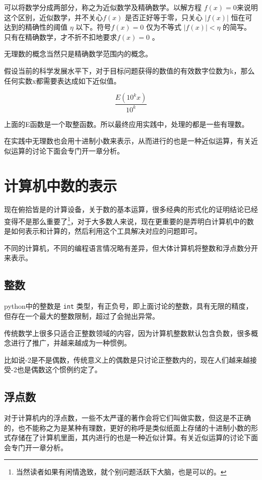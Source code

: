 \documentclass[12pt,oneside]{book}
\begin{document}
\begin{bookref}[frametitle={\cite{高观点下的初等数学第一卷}}]
可以将数学分成两部分，称之为近似数学及精确数学。以解方程 $f(x) = 0$来说明这个区别，近似数学，并不关心$f(x)$ 是否正好等于零，只关心 $|f(x)|$ 恒在可达到的精确性的阈值 $\eta$ 以下。符号$f(x)=0$ 仅为不等式 $|f(x)| < \eta$ 的简写。只有在精确数学，才不折不扣地要求$f(x)=0$ 。


无理数的概念当然只是精确数学范围内的概念。
\end{bookref}

假设当前的科学发展水平下，对于目标问题获得的数值的有效数字位数为k，那么任何实数x都需要表达成如下近似值。

\[
\frac{E(10^k x)}{10^k}
\]

上面的E函数是一个取整函数。所以最终应用实践中，处理的都是一些有理数。

在实践中无理数也会用十进制小数来表示，从而进行的也是一种近似运算，有关近似运算的讨论下面会专门开一章分析。

\section{计算机中数的表示}
现在俯拾皆是的计算设备，关于数的基本运算，很多经典的形式化的证明结论已经变得不是那么重要了\footnote{当然读者如果有闲情逸致，就个别问题活跃下大脑，也是可以的。}，对于大多数人来说，现在更重要的是弄明白计算机中的数是如何表示和计算的，然后利用这个工具解决对应的问题即可。

不同的计算机，不同的编程语言情况略有差异，但大体计算机将整数和浮点数分开来表示。

\subsection{整数}
python中的整数是 \verb+int+ 类型，有正负号，即上面讨论的整数，具有无限的精度，但存在一个最大的整数限制，超过了会抛出异常。

传统数学上很多只适合正整数领域的内容，因为计算机整数默认包含负数，很多概念进行了推广，并越来越成为一种惯例。

比如说-2是不是偶数，传统意义上的偶数是只讨论正整数内的，现在人们越来越接受-2也是偶数这个惯例约定了。



\subsection{浮点数}
对于计算机内的浮点数，一些不太严谨的著作会将它们叫做实数，但这是不正确的，也不能称之为是某种有理数，更好的称呼是类似纸面上存储的十进制小数的形式存储在了计算机里面，其内进行的也是一种近似计算。有关近似运算的讨论下面会专门开一章分析。
\end{document}
